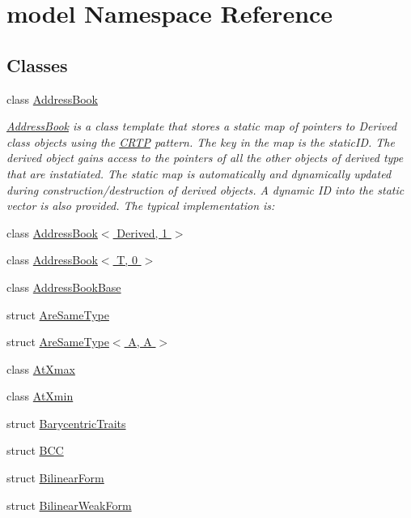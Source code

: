 \hypertarget{namespacemodel}{}\section{model Namespace Reference}
\label{namespacemodel}
\subsection*{Classes}
\begin{DoxyCompactItemize}
\item 
class \hyperlink{classmodel_1_1_address_book}{Address\+Book}
\begin{DoxyCompactList}\small\item\em \hyperlink{classmodel_1_1_address_book}{Address\+Book} is a class template that stores a static map of pointers to Derived class objects using the \hyperlink{classmodel_1_1_c_r_t_p}{C\+R\+T\+P} pattern. The key in the map is the static\+I\+D. The derived object gains access to the pointers of all the other objects of derived type that are instatiated. The static map is automatically and dynamically updated during construction/destruction of derived objects. A dynamic I\+D into the static vector is also provided. The typical implementation is\+: \end{DoxyCompactList}\item 
class \hyperlink{classmodel_1_1_address_book_3_01_derived_00_011_01_4}{Address\+Book$<$ Derived, 1 $>$}
\item 
class \hyperlink{classmodel_1_1_address_book_3_01_t_00_010_01_4}{Address\+Book$<$ T, 0 $>$}
\item 
class \hyperlink{classmodel_1_1_address_book_base}{Address\+Book\+Base}
\item 
struct \hyperlink{structmodel_1_1_are_same_type}{Are\+Same\+Type}
\item 
struct \hyperlink{structmodel_1_1_are_same_type_3_01_a_00_01_a_01_4}{Are\+Same\+Type$<$ A, A $>$}
\item 
class \hyperlink{classmodel_1_1_at_xmax}{At\+Xmax}
\item 
class \hyperlink{classmodel_1_1_at_xmin}{At\+Xmin}
\item 
struct \hyperlink{structmodel_1_1_barycentric_traits}{Barycentric\+Traits}
\item 
struct \hyperlink{structmodel_1_1_b_c_c}{B\+C\+C}
\item 
struct \hyperlink{structmodel_1_1_bilinear_form}{Bilinear\+Form}
\item 
struct \hyperlink{structmodel_1_1_bilinear_weak_form}{Bilinear\+Weak\+Form}

\end{DoxyCompactItemize}
